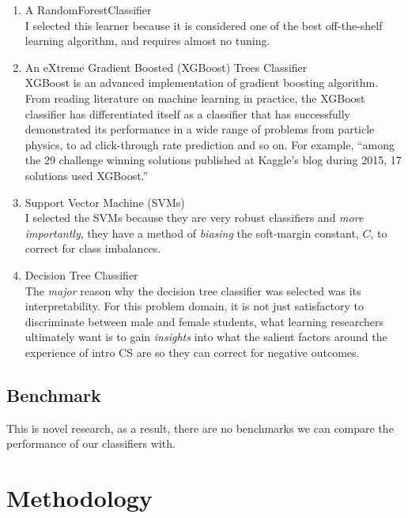 \begin{enumerate}%
\item A RandomForestClassifier\\
I selected this learner because it is considered one of the best off-the-shelf learning algorithm, and requires almost no tuning. 
\item An eXtreme Gradient Boosted (XGBoost) Trees Classifier\\
XGBoost is an advanced implementation of gradient boosting algorithm. From reading literature on machine learning in practice, the XGBoost classifier has differentiated itself as a classifier that has successfully demonstrated its performance in a wide range of problems from particle physics, to ad click-through rate prediction and so on. For example, ``among the 29 challenge winning solutions published at Kaggle's blog during 2015, 17 solutions used XGBoost.''

\item Support Vector Machine (SVMs)\\
I selected the SVMs because they are very robust classifiers and \textit{more importantly}, they have a method of \textit{biasing} the soft-margin constant, $C$, to correct for class imbalances. 
              
\item Decision Tree Classifier\\
The \textit{major} reason why the decision tree classifier was selected was its interpretability. For this problem domain, it is not just satisfactory to discriminate between male and female students, what learning researchers ultimately want is to gain \textit{insights} into what the salient factors around the experience of intro CS are so they can correct for negative outcomes.

\end{enumerate}

\section*{Benchmark}

This is novel research, as a result, there are no benchmarks we can compare the performance of our classifiers with.


\chapter*{Methodology}


